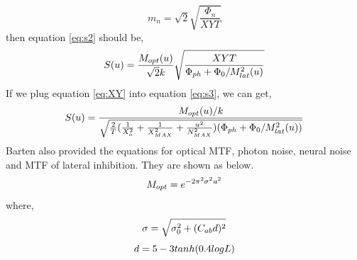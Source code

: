 \documentclass{article}
\begin{document}
\begin{equation}
    \label{eq:m_n_modified}
    m_n = \sqrt{2}\sqrt{\frac{\Phi_n}{XYT}}
\end{equation}
then equation \eqref{eq:s2} should be,
\begin{equation}
    \centering
    \label{eq:s3}
     S(u) = \frac{M_{opt}(u)}{\sqrt{2}k}\sqrt{ \frac{XYT}{\Phi_{ph} + \Phi_0/M_{lat}^2(u)}}
\end{equation}
If we plug equation \eqref{eq:XY} into equation \eqref{eq:s3}, we can get,
\begin{equation}
    \centering
    \label{eq:s4}
     S(u) = \frac{M_{opt}(u)/k}{\sqrt{\frac{2}{T}(\frac{1}{X_o^2}+\frac{1}{X_{MAX}^2}+\frac{u^2}{N_{MAX}^2})(\Phi_{ph}+\Phi_0/M_{lat}^2(u))}}
\end{equation}
Barten also provided the equations for optical MTF, photon noise, neural noise and MTF of lateral inhibition. They are shown as below.
\begin{equation}
    \centering
    \label{eq:m_opt}
    M_{opt} = e^{-2\pi^2\sigma^2u^2}
\end{equation}
where,
\begin{equation}
    \centering
    \label{eq:sigma}
    \sigma = \sqrt{\sigma_0^2+(C_{ab}d)^2}
\end{equation}
\begin{equation}
    \centering
    \label{eq:d}
    d = 5 -3 tanh(0.4logL)
\end{equation}
\end{document}
